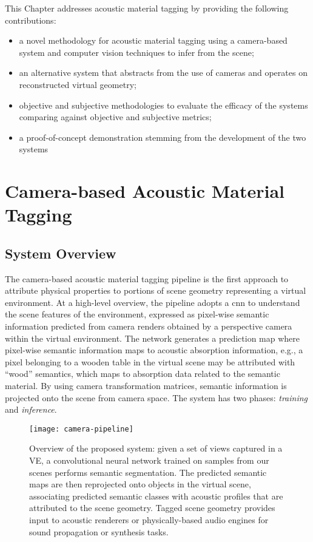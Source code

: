 This Chapter addresses acoustic material tagging by providing the following contributions:
\begin{itemize}
    \item a novel methodology for acoustic material tagging using a camera-based system and computer vision techniques to infer from the scene;
    \item an alternative system that abstracts from the use of cameras and operates on reconstructed virtual geometry;
    \item objective and subjective methodologies to evaluate the efficacy of the systems comparing against objective and subjective metrics;
    \item a proof-of-concept demonstration stemming from the development of the two systems
\end{itemize}


\section{Camera-based Acoustic Material Tagging}\label{sec:camera-tagging}
\subsection{System Overview}
The camera-based acoustic material tagging pipeline is the first approach to attribute physical properties to portions of scene geometry representing a virtual environment. At a high-level overview, the pipeline adopts a \acrfull{cnn} to understand the scene features of the environment, expressed as pixel-wise semantic information predicted from camera renders obtained by a perspective camera within the virtual environment. The network generates a prediction map where pixel-wise semantic information maps to acoustic absorption information, e.g., a pixel belonging to a wooden table in the virtual scene may be attributed with ``wood'' semantics, which maps to absorption data related to the semantic material. By using camera transformation matrices, semantic information is projected onto the scene from camera space. The system has two phases: \emph{training} and \emph{inference}.
\begin{figure}[htbp]
    \centering
    \texttt{[image: camera-pipeline]}
    \caption[Camera-based acoustic material tagging system overview]{Overview of the proposed system: given a set of views captured in a VE, a convolutional neural network trained on samples from our scenes performs semantic segmentation. The predicted semantic maps are then reprojected onto objects in the virtual scene, associating predicted semantic classes with acoustic profiles that are attributed to the scene geometry. Tagged scene geometry provides input to acoustic renderers or physically-based audio engines for sound propagation or synthesis tasks.}
    \label{fig:cog-pipeline}
\end{figure}

